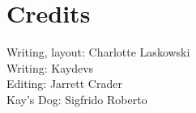 
\section{Credits}
\thispagestyle{empty}

Writing, layout: Charlotte Laskowski\\
Writing: Kaydevs\\
Editing: Jarrett Crader\\
Kay's Dog: Sigfrido Roberto

\skipline\skipline

\begin{adjustbox}{center}
\end{adjustbox}